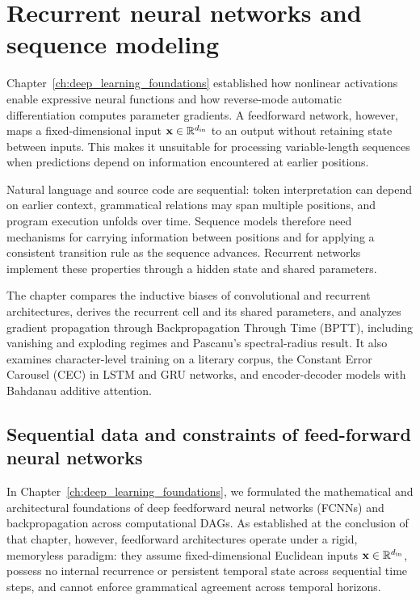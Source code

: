 \documentclass[../../main.tex]{subfiles}
\begin{document}
\chapter{Recurrent neural networks and sequence modeling}
\label{ch:rnn_sequence_modeling}

Chapter~\ref{ch:deep_learning_foundations} established how nonlinear activations enable expressive neural functions and how reverse-mode automatic differentiation computes parameter gradients. A feedforward network, however, maps a fixed-dimensional input $\mathbf{x} \in \mathbb{R}^{d_{\text{in}}}$ to an output without retaining state between inputs. This makes it unsuitable for processing variable-length sequences when predictions depend on information encountered at earlier positions.

Natural language and source code are sequential: token interpretation can depend on earlier context, grammatical relations may span multiple positions, and program execution unfolds over time. Sequence models therefore need mechanisms for carrying information between positions and for applying a consistent transition rule as the sequence advances. Recurrent networks implement these properties through a hidden state and shared parameters.

The chapter compares the inductive biases of convolutional and recurrent architectures, derives the recurrent cell and its shared parameters, and analyzes gradient propagation through Backpropagation Through Time (BPTT), including vanishing and exploding regimes and Pascanu's spectral-radius result. It also examines character-level training on a literary corpus, the Constant Error Carousel (CEC) in LSTM and GRU networks, and encoder-decoder models with Bahdanau additive attention.

\clearpage
\section{Sequential data and constraints of feed-forward neural networks}
\label{sec:fcnn_limits}

In Chapter~\ref{ch:deep_learning_foundations}, we formulated the mathematical and architectural foundations of deep feedforward neural networks (FCNNs) and backpropagation across computational DAGs. As established at the conclusion of that chapter, however, feedforward architectures operate under a rigid, memoryless paradigm: they assume fixed-dimensional Euclidean inputs $\mathbf{x} \in \mathbb{R}^{d_{\text{in}}}$, possess no internal recurrence or persistent temporal state across sequential time steps, and cannot enforce grammatical agreement across temporal horizons.
\end{document}
